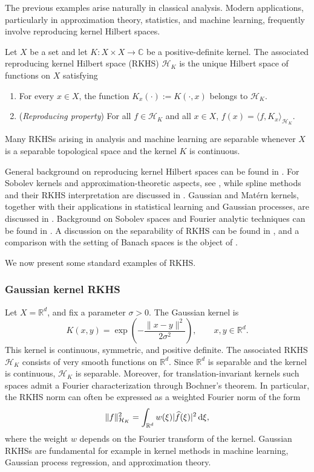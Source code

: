 \documentclass[12pt]{amsart}
\newcommand{\D}[1]{\mbox{\rm #1}}
\newcommand{\dd}{\D{d}}
\numberwithin{equation}{section}
\begin{document}
The previous examples arise naturally in classical analysis. Modern applications, particularly in approximation theory, statistics, and machine learning, frequently involve reproducing kernel Hilbert spaces.

Let $X$ be a set and let $K:X\times X\to\mathbb{C}$ be a positive-definite kernel. The associated reproducing kernel Hilbert space (RKHS) $\mathcal{H}_K$ is the unique Hilbert space of functions on $X$ satisfying
\begin{enumerate}
    \item For every $x\in X$, the function $K_x(\cdot):=K(\cdot,x)$ belongs to $\mathcal{H}_K$.
    
    \item (\emph{Reproducing property})
    For all $f\in\mathcal{H}_K$ and all $x\in X$, $f(x) = \langle f,K_x\rangle_{\mathcal{H}_K}$. 
\end{enumerate}
Many RKHSs arising in analysis and machine learning are separable whenever $X$ is a separable topological space and the kernel $K$ is continuous. 

General background on reproducing kernel Hilbert spaces can be found in \cite{aronszajn1950theory,berlinet2011reproducing}.  For Sobolev kernels and approximation-theoretic aspects, see \cite{wendland2004scattered}, while spline methods and their RKHS interpretation are discussed in \cite{wahba1990spline}. Gaussian and Mat\'ern kernels, together with their applications in statistical learning and Gaussian processes, are discussed in \cite{williams2006gaussian}.  Background on Sobolev spaces and Fourier analytic techniques can be found in \cite{stein1970singular}.  A discussion on the separability of RKHS can be found in \cite{owhadi2017separability}, and a comparison with the setting of Banach spaces is the object of \cite{fukumizu2011learning}. 


We now present some standard examples of RKHS. 


\subsubsection{Gaussian kernel RKHS}

Let $X=\mathbb{R}^d$,  and fix a parameter $\sigma>0$. 
The Gaussian kernel is
\[
    K(x,y) = \exp\left( -\frac{\|x-y\|^2}{2\sigma^2} \right), \qquad x,y\in\mathbb{R}^d.
\]
This kernel is continuous, symmetric, and positive definite. The associated RKHS $\mathcal{H}_K$ consists of very smooth functions on $\mathbb{R}^d$.  
Since $\mathbb{R}^d$ is separable and the kernel is continuous, $\mathcal{H}_K$ is separable. 
Moreover, for translation-invariant kernels such spaces admit a Fourier characterization through Bochner's theorem. In particular, the RKHS norm can often be expressed as a weighted Fourier norm of the form
\[
    \|f\|_{\mathcal H_K}^2 = \int_{\mathbb{R}^d} w(\xi) |\widehat{f}(\xi)|^2\,\dd\xi,
\]
where the weight $w$ depends on the Fourier transform of the kernel.
Gaussian RKHSs are fundamental for example in kernel methods in machine learning, Gaussian process regression, and approximation theory.
\end{document}
